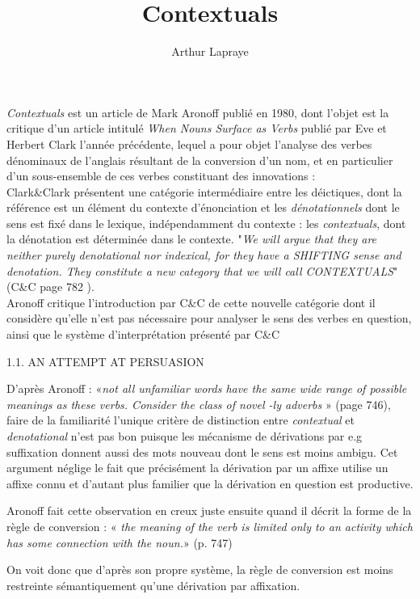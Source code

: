 \documentclass[a4paper,12pt]{article}
\author{Arthur Lapraye}
\title{Contextuals}
\begin{document}
 
 \maketitle
 

 \textit{Contextuals} est un article de Mark Aronoff publié en 1980, dont l'objet est la critique d'un article intitulé \textit{When Nouns Surface as Verbs} publié par Eve et Herbert Clark l'année précédente, lequel a pour objet l'analyse des verbes dénominaux
 de l'anglais résultant de la conversion d'un nom, et en particulier d'un sous-ensemble de ces verbes constituant des innovations : \\
 Clark\&Clark présentent une catégorie intermédiaire entre les déictiques, dont la référence est un élément du contexte d'énonciation et les \textit{dénotationnels} dont le sens est fixé dans le lexique, 
  indépendamment du contexte : les \textit{contextuals}, dont la dénotation est déterminée dans le contexte.
 "\textit{We will argue that they are neither purely denotational nor indexical, for they have a SHIFTING sense and denotation. They constitute a new category that we will call CONTEXTUALS}" (C\&C page 782 ). \\
 Aronoff critique l'introduction par C\&C de cette nouvelle catégorie dont il considère qu'elle n'est pas nécessaire pour analyser le sens des verbes en question, ainsi que le système d'interprétation présenté par C\&C
 
 1.1. AN ATTEMPT AT PERSUASION
 
 
D'après Aronoff : 
«\textit{not all unfamiliar words have the same wide range of possible meanings as these
verbs. Consider the class of novel -ly adverbs} » (page 746), faire de la familiarité l'unique critère de distinction entre \textit{contextual} et \textit{denotational} 
n'est pas bon puisque les mécanisme de dérivations par e.g suffixation donnent aussi des mots nouveau dont le sens est moins ambigu. 
Cet argument néglige le fait que précisément la dérivation par un affixe utilise un affixe connu 
et d'autant plus familier que la dérivation en question est productive.



Aronoff fait cette observation en creux juste ensuite quand il décrit la forme de la règle de conversion : 
« \textit{the meaning of the verb is limited only to an activity which has some connection with the noun.}» (p. 747) 

On voit donc que d'après son propre système, la règle de conversion est moins restreinte sémantiquement qu'une dérivation par affixation. 
\end{document}
